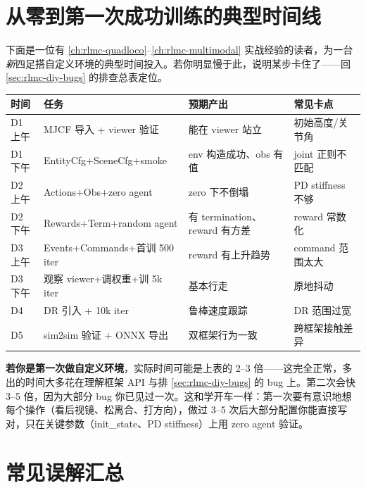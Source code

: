 \section{从零到第一次成功训练的典型时间线}
\label{sec:rlmc-diy-timeline}

下面是一位有 \cref{ch:rlmc-quadloco}--\cref{ch:rlmc-multimodal} 实战经验的读者，为一台\emph{新}四足搭自定义环境的典型时间投入。若你明显慢于此，说明某步卡住了——回 \cref{sec:rlmc-diy-bugs} 的排查总表定位。

\begin{center}
\small
\begin{tabular}{@{}lp{4.4cm}p{3.4cm}p{3.0cm}@{}}
\toprule
时间 & 任务 & 预期产出 & 常见卡点 \\
\midrule
D1 上午 & MJCF 导入 + viewer 验证 & 能在 viewer 站立 & 初始高度/关节角 \\
D1 下午 & EntityCfg+SceneCfg+smoke & env 构造成功、obs 有值 & joint 正则不匹配 \\
D2 上午 & Actions+Obs+zero agent & zero 下不倒塌 & PD stiffness 不够 \\
D2 下午 & Rewards+Term+random agent & 有 termination、reward 有方差 & reward 常数化 \\
D3 上午 & Events+Commands+首训 500 iter & reward 有上升趋势 & command 范围太大 \\
D3 下午 & 观察 viewer+调权重+训 5k iter & 基本行走 & 原地抖动 \\
D4 & DR 引入 + 10k iter & 鲁棒速度跟踪 & DR 范围过宽 \\
D5 & sim2sim 验证 + ONNX 导出 & 双框架行为一致 & 跨框架接触差异 \\
\bottomrule
\end{tabular}
\end{center}

\textbf{若你是第一次做自定义环境}，实际时间可能是上表的 2--3 倍——这完全正常，多出的时间大多花在理解框架 API 与排 \cref{sec:rlmc-diy-bugs} 的 bug 上。第二次会快 3--5 倍，因为大部分 bug 你已见过一次。这和学开车一样：第一次要有意识地想每个操作（看后视镜、松离合、打方向），做过 3--5 次后大部分配置你能直接写对，只在关键参数（init\_state、PD stiffness）上用 zero agent 验证。

\section{常见误解汇总}
\label{sec:rlmc-diy-myths}

